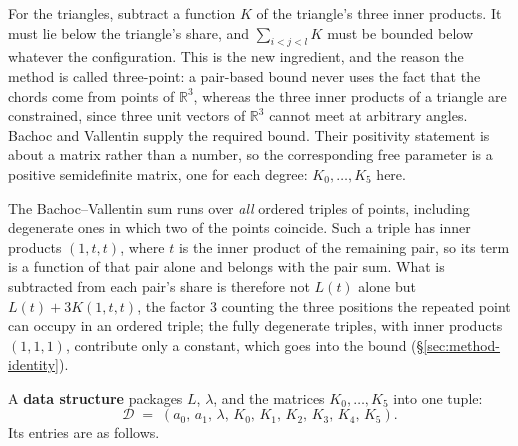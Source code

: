 \documentclass[11pt]{article}
\theoremstyle{definition}
\theoremstyle{remark}
\newcommand{\RR}{\mathbb{R}}
\begin{document}
For the triangles, subtract a function $K$ of the triangle's three
inner products. It must lie below the triangle's share, and
$\sum_{i<j<l}K$ must be bounded below whatever the configuration. This
is the new ingredient, and the reason the method is called three-point:
a pair-based bound never uses the fact that the chords come from points
of $\RR^3$, whereas the three inner products of a triangle are
constrained, since three unit vectors of $\RR^3$ cannot meet at
arbitrary angles. Bachoc and Vallentin supply the required bound. Their
positivity statement is about a matrix rather than a number, so the
corresponding free parameter is a positive semidefinite matrix, one for
each degree: $K_0,\dots,K_5$ here.

The Bachoc--Vallentin sum runs over \emph{all} ordered triples of
points, including degenerate ones in which two of the points coincide.
Such a triple has inner products $(1,t,t)$, where $t$ is the inner
product of the remaining pair, so its term is a function of that pair
alone and belongs with the pair sum. What is subtracted from each pair's
share is therefore not $L(t)$ alone but $L(t)+3K(1,t,t)$, the factor $3$
counting the three positions the repeated point can occupy in an
ordered triple; the fully degenerate triples, with inner products
$(1,1,1)$, contribute only a constant, which goes into the bound
(\S\ref{sec:method-identity}).

A \textbf{data structure} packages $L$, $\lambda$, and the matrices
$K_0,\ldots,K_5$ into one tuple:
\begin{equation}
  \mathcal{D} \;=\; (a_0,\, a_1,\, \lambda,\, K_0,\, K_1,\, K_2,\, K_3,\, K_4,\, K_5).
\end{equation}
Its entries are as follows.
\end{document}
